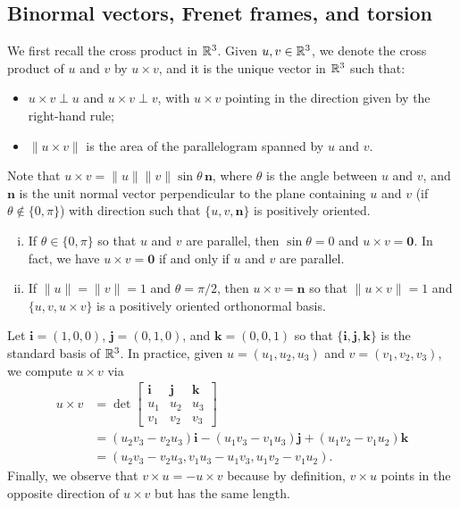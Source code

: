 \subsection{Binormal vectors, Frenet frames, and torsion} \label{subsec:2.2}
We first recall the cross product in $\mathbb{R}^3$. Given $u, v \in \mathbb{R}^3$, we 
denote the cross product of $u$ and $v$ by $u \times v$, and it is the 
unique vector in $\mathbb{R}^3$ such that: 
\begin{itemize}
    \item $u \times v \perp u$ and $u \times v \perp v$, with $u \times v$ 
    pointing in the direction given by the right-hand rule; 
    \item $\|u \times v\|$ is the area of the parallelogram spanned by 
    $u$ and $v$. 
\end{itemize}
Note that $u \times v = \|u\|\|v\| \sin\theta\,\mathbf n$, where $\theta$ 
is the angle between $u$ and $v$, and $\mathbf n$ is the unit normal 
vector perpendicular to the plane containing $u$ and $v$ (if $\theta 
\notin \{0, \pi\}$) with direction such that 
$\{u, v, \mathbf n\}$ is positively oriented. 
\begin{enumerate}[(i)]
    \item If $\theta \in \{0, \pi\}$ so that $u$ and $v$ are parallel, then 
    $\sin\theta = 0$ and $u \times v = \mathbf 0$. In fact, we have 
    $u \times v = \mathbf 0$ if and only if $u$ and $v$ are parallel.

    \item If $\|u\| = \|v\| = 1$ and $\theta = \pi/2$, then $u \times v = \mathbf n$ 
    so that $\|u \times v\| = 1$ and $\{u, v, u \times v\}$ is a positively 
    oriented orthonormal basis. 
\end{enumerate}
Let $\mathbf i = (1, 0, 0)$, $\mathbf j = (0, 1, 0)$, and $\mathbf k 
= (0, 0, 1)$ so that $\{\mathbf i, \mathbf j, \mathbf k\}$ is the standard 
basis of $\mathbb{R}^3$. In practice, given $u = (u_1, u_2, u_3)$ and $v = (v_1, v_2, v_3)$, 
we compute $u \times v$ via 
\begin{align*} 
    u \times v &= \det \begin{bmatrix} 
        \mathbf i & \mathbf j & \mathbf k \\ 
        u_1 & u_2 & u_3 \\ 
        v_1 & v_2 & v_3 
    \end{bmatrix} \\ 
    &= (u_2v_3 - v_2u_3)\mathbf i - (u_1v_3 - v_1u_3)\mathbf j + (u_1v_2 - v_1u_2)\mathbf k \\
    &= (u_2v_3 - v_2u_3, v_1u_3 - u_1v_3, u_1v_2 - v_1u_2).
\end{align*}
Finally, we observe that $v \times u = -u \times v$ because by definition, 
$v \times u$ points in the opposite direction of $u \times v$ but has the 
same length.

